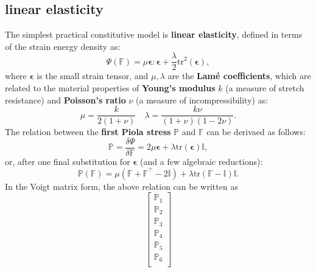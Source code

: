 \documentclass[11pt]{amsart}
\numberwithin{figure}{section}
\theoremstyle{plain}
\theoremstyle{definition}
\numberwithin{equation}{section}
\begin{document}
\subsection{linear elasticity}
The simplest practical constitutive model is \textbf{linear elasticity}, 
defined in terms of the strain energy density as: 
\[
  \Psi \left(\mathbb{F}\right) = 
  \mu \bm{\epsilon} : \bm{\epsilon} 
  + \frac{ \lambda }{ 2 } \text{tr} ^{2} \left(\bm{\epsilon}\right),
\] 
where $\bm{\epsilon}$ is the small strain tensor, 
and $\mu, \lambda$ are the \textbf{Lam\'e coefficients}, 
which are related to the material properties of  \textbf{Young's modulus} $k$ (a measure of stretch resistance) and \textbf{Poisson's ratio} $\nu$ (a measure of incompressibility) as:
\[
\mu = \frac{ k }{ 2 \left(1+\nu\right) } \quad 
\lambda = \frac{ k \nu }{ \left(1+\nu\right) \left(1 - 2\nu\right) } .
\] 
The relation between the  \textbf{first Piola stress} $\mathbb{P}$ and $\mathbb{F}$ can be derivaed as follows:
\[
  \mathbb{P} = \frac{ \delta \Psi }{ \delta \mathbb{F} }  = 
  2 \mu \bm{\epsilon} + \lambda \text{tr} \left(\bm{\epsilon}\right) \mathbb{I},
\] 
or, after one final substitution for $\bm{\epsilon}$ (and a few algebraic reductions):
\[
  \mathbb{P} \left(\mathbb{F}\right) = 
  \mu \left(\mathbb{F} + \mathbb{F}^{\top} - 2 \mathbb{I}\right) 
  + \lambda \text{tr} \left(\mathbb{F} - \mathbb{I}\right) \mathbb{I}.
\] 
In the Voigt matrix form, the above relation can be written as 
\[
\left[
\begin{array}{c}
\mathbb{P}_{1} \\
\mathbb{P}_{2} \\
\mathbb{P}_{3} \\
\mathbb{P}_{4} \\
\mathbb{P}_{5} \\
\mathbb{P}_{6} \\
\end{array}
\right]
\] 
\end{document}
